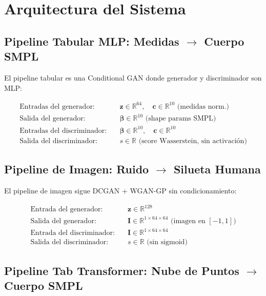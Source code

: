 \documentclass[a4paper,11pt]{article}
\begin{document}
\section{Arquitectura del Sistema}

\subsection{Pipeline Tabular MLP: Medidas $\to$ Cuerpo SMPL}

El pipeline tabular es una Conditional GAN donde generador y discriminador
son MLP:

\begin{align*}
    \text{Entradas del generador:}\quad   & \bm{z}\in\mathbb{R}^{64},\quad
                                             \bm{c}\in\mathbb{R}^{10} \text{ (medidas norm.)} \\
    \text{Salida del generador:}\quad      & \bm{\beta}\in\mathbb{R}^{10} \text{ (shape params SMPL)} \\
    \text{Entradas del discriminador:}\quad & \bm{\beta}\in\mathbb{R}^{10},\quad
                                              \bm{c}\in\mathbb{R}^{10} \\
    \text{Salida del discriminador:}\quad  & s\in\mathbb{R} \text{ (score Wasserstein, sin activación)}
\end{align*}

\subsection{Pipeline de Imagen: Ruido $\to$ Silueta Humana}

El pipeline de imagen sigue DCGAN + WGAN-GP sin condicionamiento:

\begin{align*}
    \text{Entrada del generador:}\quad   & \bm{z}\in\mathbb{R}^{128} \\
    \text{Salida del generador:}\quad    & \bm{I}\in\mathbb{R}^{1\times64\times64}
                                           \text{ (imagen en } [-1,1]) \\
    \text{Entrada del discriminador:}\quad & \bm{I}\in\mathbb{R}^{1\times64\times64} \\
    \text{Salida del discriminador:}\quad  & s\in\mathbb{R} \text{ (sin sigmoid)}
\end{align*}

\subsection{Pipeline Tab Transformer: Nube de Puntos $\to$ Cuerpo SMPL}
\end{document}
